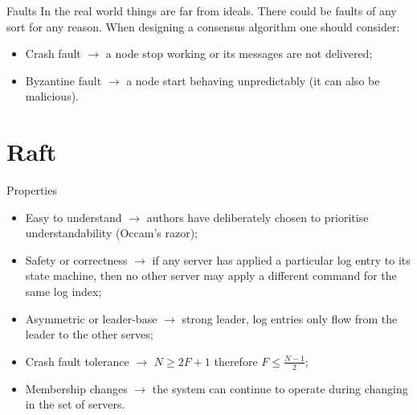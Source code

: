 \documentclass[presentation]{beamer}\mode<presentation>{\usetheme{AMSBolognaFC}}
\begin{document}
\begin{frame}{Faults}
    In the real world things are far from ideals.
    There could be faults of any sort for any reason.
    When designing a consensus algorithm one should consider:
    \begin{itemize}
        \item Crash fault $\rightarrow$ a node stop working or its messages are not delivered;
        \item Byzantine fault $\rightarrow$ a node start behaving unpredictably (it can also be malicious).
    \end{itemize}
\end{frame}

\section{Raft}

\begin{frame}{Properties}
    \begin{itemize}
        \item Easy to understand $\rightarrow$ authors have deliberately chosen to prioritise understandability (Occam's razor);
        \item Safety or correctness $\rightarrow$ if any server has applied a particular log entry to its state machine, then no other server may apply a different command for the same log index;
        \item Asymmetric or leader-base $\rightarrow$ strong leader, log entries only flow from the leader to the other serves;
        \item Crash fault tolerance $\rightarrow$ $N \ge 2F + 1$ therefore $F \le \frac{N - 1}{2}$;
        \item Membership changes $\rightarrow$ the system can continue to operate during changing in the set of servers.
    \end{itemize}
\end{frame}
\end{document}
